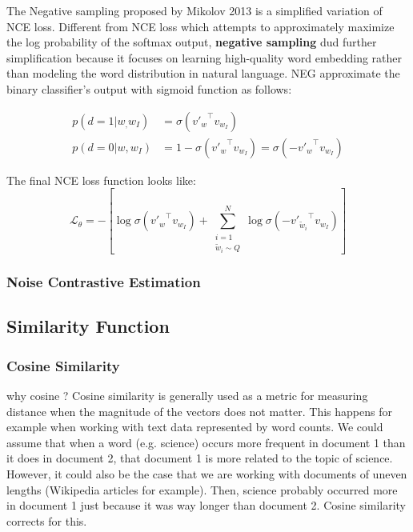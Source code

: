 \documentclass[phd,tocprelim]{cornell}
\begin{document}
The Negative sampling proposed by Mikolov 2013 is a simplified variation of NCE loss. Different from NCE loss which attempts to approximately maximize the log probability of the softmax output, \textbf{negative sampling} dud further simplification because it focuses on learning high-quality word embedding rather than modeling the word distribution in natural language.  NEG approximate the binary classifier's output with sigmoid function as follows:

\begin{align*}
p(d=1 \vert w_, w_I) &= \sigma({v'_{w}}^\top v_{w_I}) \\
p(d=0 \vert w, w_I) &= 1 - \sigma({v'_{w}}^\top v_{w_I}) = \sigma(-{v'_{w}}^\top v_{w_I})
\end{align*} %

The final NCE loss function looks like:
\begin{equation}
\mathcal{L}_\theta = - [ \log \sigma({v'_{w}}^\top v_{w_I}) +  \sum_{\substack{i=1 \\ \tilde{w}_i \sim Q}}^N \log \sigma(-{v'_{\tilde{w}_i}}^\top v_{w_I})]
\end{equation}






\subsubsection{Noise Contrastive Estimation}

\subsection{Similarity Function}
\subsubsection{Cosine Similarity}




why cosine ? 
Cosine similarity is generally used as a metric for measuring distance when the magnitude of the vectors does not matter. This happens for example when working with text data represented by word counts. We could assume that when a word (e.g. science) occurs more frequent in document 1 than it does in document 2, that document 1 is more related to the topic of science. However, it could also be the case that we are working with documents of uneven lengths (Wikipedia articles for example). Then, science probably occurred more in document 1 just because it was way longer than document 2. Cosine similarity corrects for this.
\end{document}
